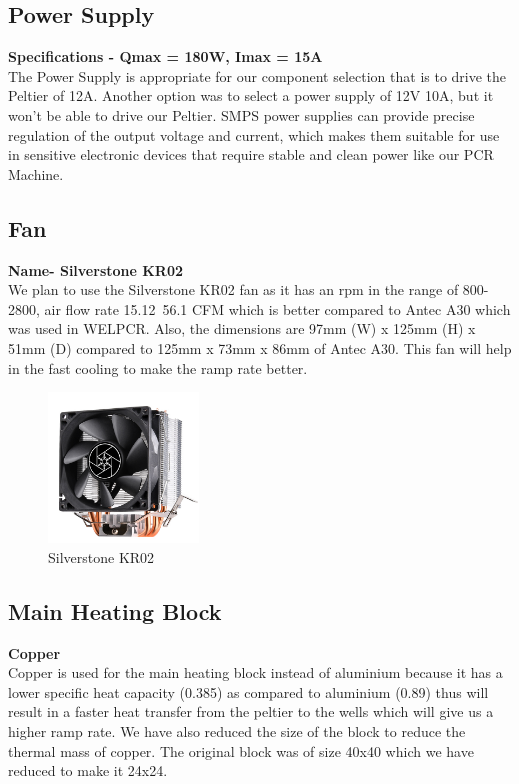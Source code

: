 \documentclass[12pt]{article}
\begin{document}
\subsection{Power Supply}
\textbf{Specifications - Qmax = 180W, Imax = 15A}\\
The Power Supply is appropriate for our component selection that is to drive the Peltier of 12A. Another option was to select a power supply of 12V 10A, but it won't be able to drive our Peltier. SMPS power supplies can provide precise regulation of the output voltage and current, which makes them suitable for use in sensitive electronic devices that require stable and clean power like our PCR Machine.

\subsection{Fan}
\textbf{Name- Silverstone KR02}\\
We plan to use the Silverstone KR02 fan as it has an rpm in the range of 800-2800, air flow rate 15.12~56.1 CFM which is better compared to Antec A30 which was used in WELPCR. Also, the dimensions are 97mm (W) x 125mm (H) x 51mm (D) compared to 125mm x 73mm x 86mm of Antec A30. This fan will help in the fast cooling to make the ramp rate better.


\begin{figure}[htp]
    \centering
    \includegraphics[width=4cm]{Images/fan.jpg}
    \caption{Silverstone KR02}
    \label{fig:galaxy}
\end{figure}


\subsection{Main Heating Block}
\textbf{Copper}\\
Copper is used for the main heating block instead of aluminium because it has a lower specific heat capacity (0.385) as compared to aluminium (0.89) thus will result in a faster heat transfer from the peltier to the wells which will give us a higher ramp rate. We have also reduced the size of the block to reduce the thermal mass of copper. The original block was of size 40x40 which we have reduced to make it 24x24.
\end{document}
